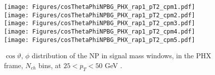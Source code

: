 \documentclass[12pt]{article}
\newcommand{\pt}{$p_{\mathrm{T}}$}
\begin{document}
\begin{figure}[htbp]
\centering
\texttt{[image: Figures/cosThetaPhiNPBG\_PHX\_rap1\_pT2\_cpm1.pdf]}
\texttt{[image: Figures/cosThetaPhiNPBG\_PHX\_rap1\_pT2\_cpm2.pdf]}
\texttt{[image: Figures/cosThetaPhiNPBG\_PHX\_rap1\_pT2\_cpm3.pdf]}
\texttt{[image: Figures/cosThetaPhiNPBG\_PHX\_rap1\_pT2\_cpm4.pdf]}
\texttt{[image: Figures/cosThetaPhiNPBG\_PHX\_rap1\_pT2\_cpm5.pdf]}
\caption{$\cos\vartheta,\,\phi$ distribution of the NP in signal mass windows, 
	in the PHX frame, $N_{ch}$ bins, at $25 < p_{T} < 50$ GeV .}
\end{figure}
\clearpage

\end{document}
